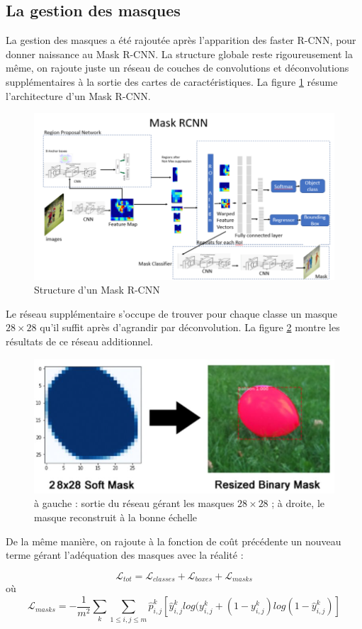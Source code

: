 \subsection{La gestion des masques}

La gestion des masques a été rajoutée après l'apparition des faster R-CNN, pour donner naissance au Mask R-CNN. La structure globale reste rigoureusement la même, on rajoute juste un réseau de couches de convolutions et déconvolutions supplémentaires à la sortie des cartes de caractéristiques. La figure \ref{Structure_Mask_R_CNN} résume l'architecture d'un Mask R-CNN.

\begin{figure}[!h]
\centering
\includegraphics[width=200pts]{images/Mask_R_CNN/structure_Mask_R_CNN.png} 
\caption{Structure d'un Mask R-CNN}
\label{Structure_Mask_R_CNN}
\end{figure}

Le réseau supplémentaire s'occupe de trouver pour chaque classe un masque $28 \times 28$ qu'il suffit après d'agrandir par déconvolution.
La figure \ref{masks} montre les résultats de ce réseau additionnel.

\begin{figure}[!h]
\centering
\includegraphics[width=200pts]{images/Mask_R_CNN/masks.png} 
\caption{à gauche : sortie du réseau gérant les masques $28 \times 28$ ; à droite, le masque reconstruit à la bonne échelle}
\label{masks}
\end{figure}

De la même manière, on rajoute à la fonction de coût précédente un nouveau terme gérant l'adéquation des masques avec la réalité :

$$\mathcal{L}_{tot} = \mathcal{L}_{classes} + \mathcal{L}_{boxes} + \mathcal{L}_{masks}$$ 
où 
$$\mathcal{L}_{masks} = -\frac{1}{m^2} \sum_k \sum_{1 \leq i,j \leq m} \hat{p}^k_{i,j}[ \hat{y}^k_{i,j} log(y^k_{i,j} + (1-y^k_{i,j}) log(1-\hat{y}^k_{i,j})]$$

